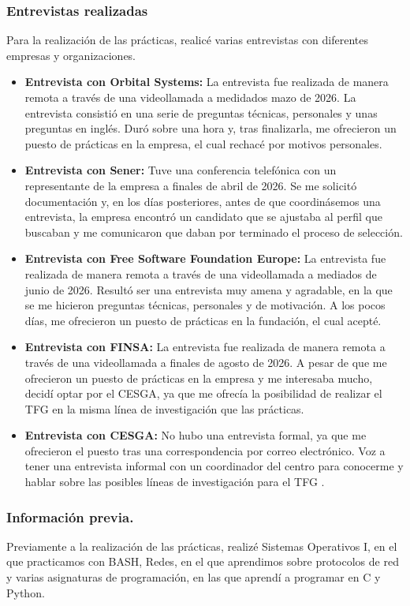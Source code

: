 \subsubsection{Entrevistas realizadas}\label{subsubsec:entrevistas}
    Para la realización de las prácticas, realicé varias entrevistas con diferentes empresas y organizaciones.
    \begin{itemize}
        \item \textbf{Entrevista con Orbital Systems:} La entrevista fue realizada de manera remota a través de una videollamada a medidados mazo de 2026.
        La entrevista consistió en una serie de preguntas técnicas, personales y unas preguntas en inglés.
        Duró sobre una hora y, tras finalizarla, me ofrecieron un puesto de prácticas en la empresa, el cual rechacé por motivos personales.
        \item \textbf{Entrevista con Sener:} Tuve una conferencia telefónica con un representante de la empresa a finales de abril de 2026.
        Se me solicitó documentación y, en los días posteriores, antes de que coordinásemos una entrevista, la empresa encontró un candidato
        que se ajustaba al perfil que buscaban y me comunicaron que daban por terminado el proceso de selección.
        \item \textbf{Entrevista con Free Software Foundation Europe:} La entrevista fue realizada de manera remota a través de una videollamada a mediados de junio de 2026.
        Resultó ser una entrevista muy amena y agradable, en la que se me hicieron preguntas técnicas, personales y de motivación.
        A los pocos días, me ofrecieron un puesto de prácticas en la fundación, el cual acepté.
        \item \textbf{Entrevista con FINSA:} La entrevista fue realizada de manera remota a través de una videollamada a finales de agosto de 2026.
        A pesar de que me ofrecieron un puesto de prácticas en la empresa y me interesaba mucho, decidí optar por el CESGA, ya que me ofrecía la posibilidad de realizar el TFG en la misma línea de investigación que las prácticas.
        \item \textbf{Entrevista con CESGA:} No hubo una entrevista formal, ya que me ofrecieron el puesto tras una correspondencia por correo electrónico.
        Voz a tener una entrevista informal con un coordinador del centro para conocerme y hablar sobre las posibles líneas de investigación para el TFG .
    \end{itemize}

\subsubsection{Información previa.}\label{subsubsec:informacion-previa}
    Previamente a la realización de las prácticas, realizé Sistemas Operativos I, en el que practicamos con BASH,
    Redes, en el que aprendimos sobre protocolos de red y varias asignaturas de programación, en las que aprendí a programar en C y Python.

